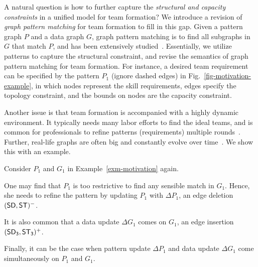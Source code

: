 
A natural question is how to further capture the {\em structural and capacity constraints} in a unified model for team formation?
We  introduce a revision of {\em graph pattern matching} for team formation to fill in this gap.
% 
Given a pattern graph $P$ and a data graph $G$, graph pattern matching is to find all subgraphs in $G$ that match $P$, and has been extensively studied~\cite{Ullmann76,infsimu95,FanLMTWW10,MaCFHW14,Guanfeng15,FanCount16}.  Essentially, we utilize patterns to capture the structural constraint, and revise the semantics of graph pattern matching for team formation. For instance, a desired team requirement can be specified by the pattern $P_1$ (ignore dashed edges) in Fig.~\ref{fig-motivation-example}, in which nodes represent the skill requirements,  edges specify the topology constraint, and the bounds on nodes are the capacity constraint.



Another issue is that team formation is accompanied with a highly dynamic environment. It typically needs many labor efforts to find the ideal teams, and is common for professionals to refine patterns  (requirements) multiple rounds~\cite{SajjadPG12,HabibiP15}. Further, real-life graphs are often big and constantly evolve over time~\cite{FanWW13-tods}. We show this with an example.

\begin{example}
\label{exm-motivation-inc}
Consider $P_{1}$ and $G_{1}$ in Example~\ref{exm-motivation} again.
	
One may find that $P_1$ is too restrictive to find any sensible match in  $G_{1}$.
Hence, she needs to refine the pattern by updating $P_1$ with $\Delta P_{1}$, \eg an edge
deletion $({\mathsf{SD}},{\mathsf{ST}})^-$.
	
 It is also common that a data update $\Delta G_1$ comes on $G_1$, \eg an edge insertion $({\mathsf{SD_3}},{\mathsf{ST_3}})^+$.
	
 Finally, it can be the case when pattern update $\Delta P_{1}$  and data update $\Delta G_{1}$ come simultaneously on $P_1$ and $G_1$.
\end{example}

